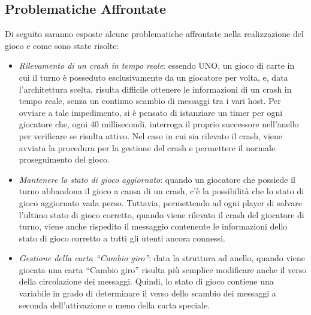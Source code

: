 \documentclass[11pt]{article} %
\begin{document}
\subsection{Problematiche Affrontate}
Di seguito saranno esposte alcune problematiche affrontate nella realizzazione del gioco e come sono state risolte:
\begin{itemize}
  \item \emph{Rilevamento di un crash in tempo reale}: essendo UNO, un gioco di carte in cui il turno è posseduto esclusivamente da un giocatore per volta, e,
  data l'architettura scelta, risulta difficile ottenere le informazioni di un crash in tempo reale, senza un continuo scambio di messaggi tra i vari host.
  Per ovviare a tale impedimento, si è pensato di istanziare un timer per ogni giocatore che, ogni 40 millisecondi, interroga il proprio successore nell'anello
  per verificare se risulta attivo. Nel caso in cui sia rilevato il crash, viene avviata la procedura per la gestione del crash e permettere il normale 
  proseguimento del gioco.
  \item \emph{Mantenere lo stato di gioco aggiornato}: quando un giocatore che possiede il turno abbandona il gioco a causa di un crash, c'è la possibilità che 
  lo stato di gioco aggiornato vada perso. Tuttavia, permettendo ad ogni player di salvare l'ultimo stato di gioco corretto, quando viene rilevato il crash del 
  giocatore di turno, viene anche rispedito il messaggio contenente le informazioni dello stato di gioco corretto a tutti gli utenti ancora connessi.
  \item \emph{Gestione della carta ``Cambio giro''}: data la struttura ad anello, quando viene giocata una carta ``Cambio giro'' risulta più semplice modificare
  anche il verso della circolazione dei messaggi. Quindi, lo stato di gioco contiene una variabile in grado di determinare il verso dello scambio dei messaggi
  a seconda dell'attivazione o meno della carta speciale.
\end{itemize}
\end{document}

